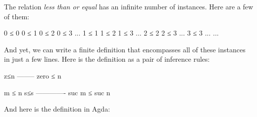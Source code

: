 The relation \emph{less than or equal} has an infinite number of
instances. Here are a few of them:

\begin{myDisplay}
0 ≤ 0     0 ≤ 1     0 ≤ 2     0 ≤ 3     ...
          1 ≤ 1     1 ≤ 2     1 ≤ 3     ...
                    2 ≤ 2     2 ≤ 3     ...
                              3 ≤ 3     ...
                                        ...
\end{myDisplay}

And yet, we can write a finite definition that encompasses all of these
instances in just a few lines. Here is the definition as a pair of
inference rules:

\begin{myDisplay}
z≤n --------
    zero ≤ n

    m ≤ n
s≤s -------------
    suc m ≤ suc n
\end{myDisplay}

And here is the definition in Agda:

\begin{fence}
\begin{code}%
\>[0]\AgdaSpace{}%
\AgdaSpace{}%
\AgdaSymbol{:}\AgdaSpace{}%
\AgdaSpace{}%
\AgdaSpace{}%
\AgdaSpace{}%
\AgdaSpace{}%
\AgdaSpace{}%
\<%
\\
%
\\[\AgdaEmptyExtraSkip]%
\>[0][@{}l@{\AgdaIndent{0}}]%
\>[2]%
\>[30I]\AgdaSymbol{:}\AgdaSpace{}%
\AgdaSpace{}%
\AgdaSymbol{\{}\AgdaSpace{}%
\AgdaSymbol{:}\AgdaSpace{}%
\AgdaSymbol{\}}\<%
\\
\>[.][@{}l@{}]\<[30I]%
\>[6]\AgdaComment{--------}\<%
\\
\>[2][@{}l@{\AgdaIndent{0}}]%
\>[4]\AgdaSpace{}%
\AgdaSpace{}%
\AgdaSpace{}%
\<%
\\
%
\\[\AgdaEmptyExtraSkip]%
%
\>[2]\AgdaSpace{}%
\AgdaSymbol{:}\AgdaSpace{}%
\AgdaSpace{}%
\AgdaSymbol{\{}\AgdaSpace{}%
\AgdaSpace{}%
\AgdaSymbol{:}\AgdaSpace{}%
\AgdaSymbol{\}}\<%
\\
\>[2][@{}l@{\AgdaIndent{0}}]%
\>[4]%
\>[44I]\AgdaSpace{}%
\AgdaSpace{}%
\<%
\\
\>[.][@{}l@{}]\<[44I]%
\>[6]\AgdaComment{-------------}\<%
\\
%
\>[4]\AgdaSpace{}%
\AgdaSpace{}%
\AgdaSpace{}%
\AgdaSpace{}%
\AgdaSpace{}%
\<%
\end{code}
\end{fence}

